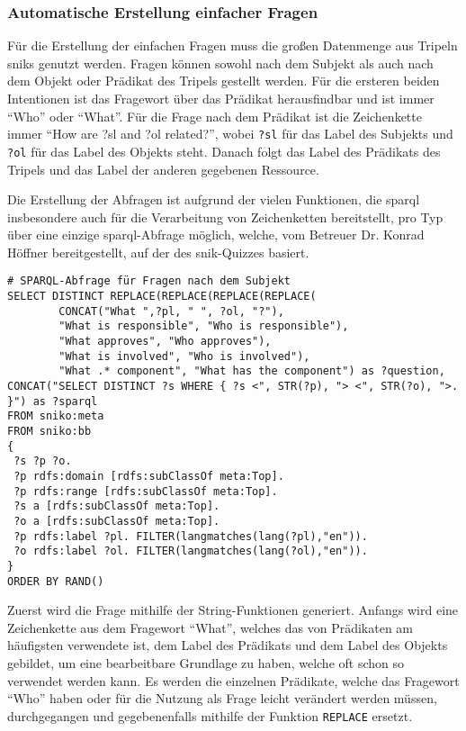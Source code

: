 \subsubsection{Automatische Erstellung einfacher Fragen}

Für die Erstellung der einfachen Fragen muss die großen Datenmenge aus Tripeln \ac{snik}s genutzt werden.
Fragen können sowohl nach dem Subjekt als auch nach dem Objekt oder Prädikat des Tripels gestellt werden.
Für die ersteren beiden Intentionen ist das Fragewort über das Prädikat herausfindbar und ist immer \enquote{Who} oder \enquote{What}.
Für die Frage nach dem Prädikat ist die Zeichenkette immer \enquote{How are ?sl and ?ol related?}, wobei \texttt{?sl} für das Label des Subjekts und \texttt{?ol} für das Label des Objekts steht.
Danach folgt das Label des Prädikats des Tripels und das Label der anderen gegebenen Ressource.

Die Erstellung der Abfragen ist aufgrund der vielen Funktionen, die \ac{sparql} insbesondere auch für die Verarbeitung von Zeichenketten bereitstellt, pro Typ über eine einzige \ac{sparql}-Abfrage möglich,
welche, vom Betreuer Dr. Konrad Höffner bereitgestellt, auf der des \ac{snik}-Quizzes basiert.

\begin{lstlisting}[language=SPARQL]
# SPARQL-Abfrage für Fragen nach dem Subjekt
SELECT DISTINCT REPLACE(REPLACE(REPLACE(REPLACE(
        CONCAT("What ",?pl, " ", ?ol, "?"),
        "What is responsible", "Who is responsible"),
        "What approves", "Who approves"),
        "What is involved", "Who is involved"),
        "What .* component", "What has the component") as ?question,
CONCAT("SELECT DISTINCT ?s WHERE { ?s <", STR(?p), "> <", STR(?o), ">. }") as ?sparql
FROM sniko:meta
FROM sniko:bb
{
 ?s ?p ?o.
 ?p rdfs:domain [rdfs:subClassOf meta:Top].
 ?p rdfs:range [rdfs:subClassOf meta:Top].
 ?s a [rdfs:subClassOf meta:Top].
 ?o a [rdfs:subClassOf meta:Top].
 ?p rdfs:label ?pl. FILTER(langmatches(lang(?pl),"en")).
 ?o rdfs:label ?ol. FILTER(langmatches(lang(?ol),"en")).
}
ORDER BY RAND()
\end{lstlisting}

Zuerst wird die Frage mithilfe der String-Funktionen generiert.
Anfangs wird eine Zeichenkette aus dem Fragewort \enquote{What}, welches das von Prädikaten am häufigsten verwendete ist, dem Label des Prädikats und dem Label des Objekts gebildet,
um eine bearbeitbare Grundlage zu haben, welche oft schon so verwendet werden kann.
Es werden die einzelnen Prädikate, welche das Fragewort \enquote{Who} haben oder für die Nutzung als Frage leicht verändert werden müssen,
durchgegangen und gegebenenfalls mithilfe der Funktion \texttt{REPLACE} ersetzt.

